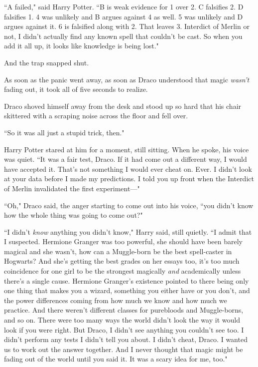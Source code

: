 ``A failed," said Harry Potter. ``B is weak evidence for 1 over 2. C falsifies 2. D falsifies 1. 4 was unlikely and B argues against 4 as well. 5 was unlikely and D argues against it. 6 is falsified along with 2. That leaves 3. Interdict of Merlin or not, I didn't actually find any known spell that couldn't be cast. So when you add it all up, it looks like knowledge is being lost."

And the trap snapped shut.

As soon as the panic went away, as soon as Draco understood that magic \emph{wasn't} fading out, it took all of five seconds to realize.

Draco shoved himself away from the desk and stood up so hard that his chair skittered with a scraping noise across the floor and fell over.

``So it was all just a stupid trick, then."

Harry Potter stared at him for a moment, still sitting. When he spoke, his voice was quiet. ``It was a fair test, Draco. If it had come out a different way, I would have accepted it. That's not something I would ever cheat on. Ever. I didn't look at your data before I made my predictions. I told you up front when the Interdict of Merlin invalidated the first experiment—"

``Oh," Draco said, the anger starting to come out into his voice, ``you didn't know how the whole thing was going to come out?"

``I didn't \emph{know} anything you didn't know," Harry said, still quietly. ``I admit that I suspected. Hermione Granger was too powerful, she should have been barely magical and she wasn't, how can a Muggle-born be the best spell-caster in Hogwarts? And she's getting the best grades on her essays too, it's too much coincidence for one girl to be the strongest magically \emph{and} academically unless there's a single cause. Hermione Granger's existence pointed to there being only one thing that makes you a wizard, something you either have or you don't, and the power differences coming from how much we know and how much we practice. And there weren't different classes for purebloods and Muggle-borns, and so on. There were too many ways the world didn't look the way it would look if you were right. But Draco, I didn't see anything you couldn't see too. I didn't perform any tests I didn't tell you about. I didn't cheat, Draco. I wanted us to work out the answer together. And I never thought that magic might be fading out of the world until you said it. It was a scary idea for me, too."

